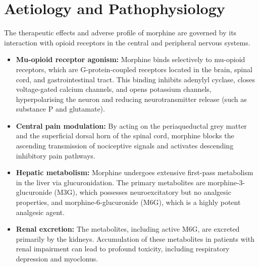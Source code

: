 \section*{Aetiology and Pathophysiology}
The therapeutic effects and adverse profile of morphine are governed by its interaction with opioid receptors in the central and peripheral nervous systems.
\begin{itemize}
    \item \textbf{Mu-opioid receptor agonism:} Morphine binds selectively to mu-opioid receptors, which are G-protein-coupled receptors located in the brain, spinal cord, and gastrointestinal tract. This binding inhibits adenylyl cyclase, closes voltage-gated calcium channels, and opens potassium channels, hyperpolarising the neuron and reducing neurotransmitter release (such as substance P and glutamate).
    \item \textbf{Central pain modulation:} By acting on the periaqueductal grey matter and the superficial dorsal horn of the spinal cord, morphine blocks the ascending transmission of nociceptive signals and activates descending inhibitory pain pathways.
    \item \textbf{Hepatic metabolism:} Morphine undergoes extensive first-pass metabolism in the liver via glucuronidation. The primary metabolites are morphine-3-glucuronide (M3G), which possesses neuroexcitatory but no analgesic properties, and morphine-6-glucuronide (M6G), which is a highly potent analgesic agent.
    \item \textbf{Renal excretion:} The metabolites, including active M6G, are excreted primarily by the kidneys. Accumulation of these metabolites in patients with renal impairment can lead to profound toxicity, including respiratory depression and myoclonus.
\end{itemize}

